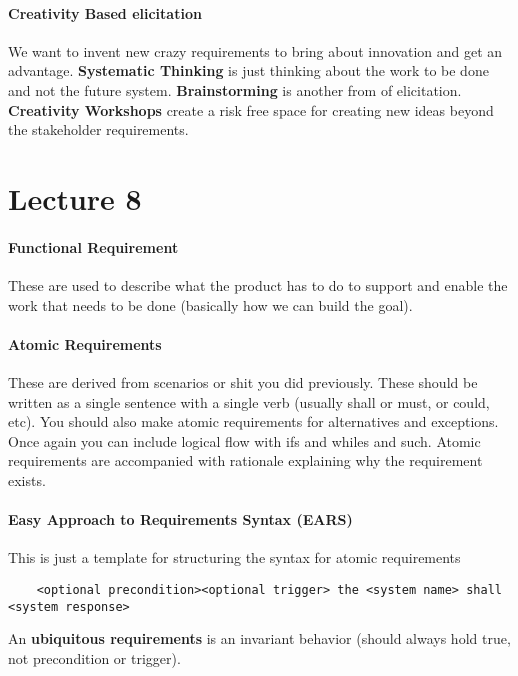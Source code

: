 \documentclass[12pt]{article}
\begin{document}
\paragraph{Creativity Based elicitation} 
\label{par:creativity_based_elicitation}
We want to invent new crazy requirements to bring about innovation and get an advantage. \textbf{Systematic Thinking} is just thinking about the work to be done and not the future system. \textbf{Brainstorming} is another from of elicitation. \textbf{Creativity Workshops} create a risk free space for creating new ideas beyond the stakeholder requirements.

\section*{Lecture 8}
\label{sec:lecture_8}
\paragraph{Functional Requirement} 
\label{par:functional_requirement}
These are used to describe what the product has to do to support and enable the work that needs to be done (basically how we can build the goal). 

\paragraph{Atomic Requirements} 
\label{par:atomic_requirements}
These are derived from scenarios or shit you did previously. These should be written as a single sentence with a single verb (usually shall or must, or could, etc). You should also make atomic requirements for alternatives and exceptions. Once again you can include logical flow with ifs and whiles and such. Atomic requirements are accompanied with rationale explaining why the requirement exists. 

\paragraph{Easy Approach to Requirements Syntax (EARS)} 
\label{par:easy_approach_to_requirements_syntax_}
This is just a template for structuring the syntax for atomic requirements
\begin{verbatim}
	<optional precondition><optional trigger> the <system name> shall <system response>
\end{verbatim}
An \textbf{ubiquitous requirements} is an invariant behavior (should always hold true, not precondition or trigger).
\end{document}

